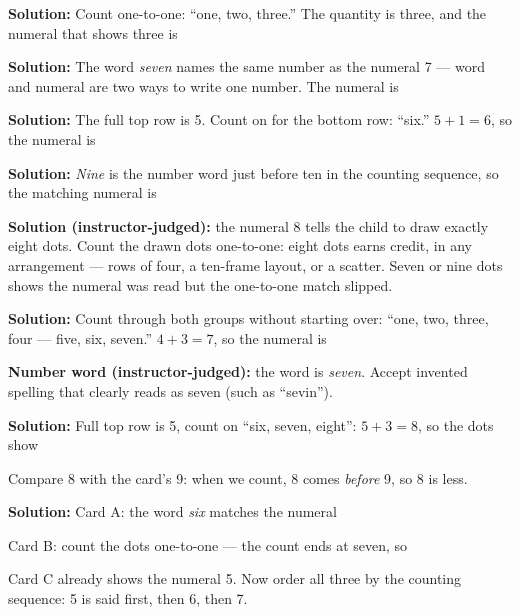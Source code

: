 \documentclass[12pt]{article}
\begin{document}



\textbf{Solution:} Count one-to-one: ``one, two, three.'' The quantity is
three, and the numeral that shows three is 


\textbf{Solution:} The word \emph{seven} names the same number as the numeral
7 --- word and numeral are two ways to write one number. The numeral is 


\textbf{Solution:} The full top row is 5. Count on for the bottom row:
``six.'' $5 + 1 = 6$, so the numeral is 


\textbf{Solution:} \emph{Nine} is the number word just before ten in the
counting sequence, so the matching numeral is 


\textbf{Solution (instructor-judged):} the numeral 8 tells the child to draw
exactly eight dots. Count the drawn dots one-to-one: eight dots earns credit,
in any arrangement --- rows of four, a ten-frame layout, or a scatter. Seven
or nine dots shows the numeral was read but the one-to-one match slipped.


\textbf{Solution:} Count through both groups without starting over: ``one,
two, three, four --- five, six, seven.'' $4 + 3 = 7$, so the numeral is 

\textbf{Number word (instructor-judged):} the word is \emph{seven}. Accept
invented spelling that clearly reads as seven (such as ``sevin'').


\textbf{Solution:} Full top row is 5, count on ``six, seven, eight'':
$5 + 3 = 8$, so the dots show 

Compare 8 with the card's 9: when we count, 8 comes \emph{before} 9, so 8 is
less. 


\textbf{Solution:} Card A: the word \emph{six} matches the numeral 

Card B: count the dots one-to-one --- the count ends at seven, so 

Card C already shows the numeral 5. Now order all three by the counting
sequence: 5 is said first, then 6, then 7. 
\end{document}
